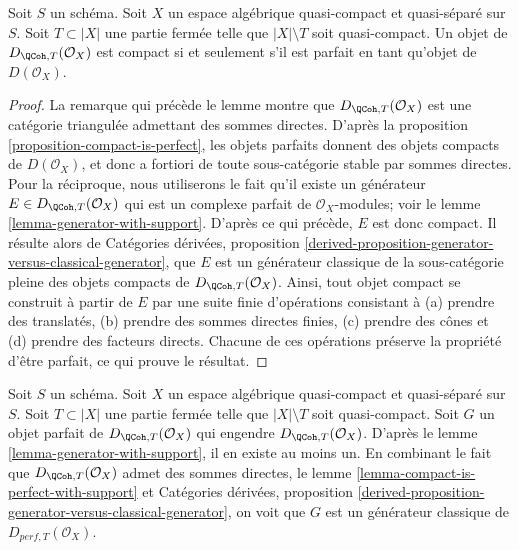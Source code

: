 \begin{lemma}
\label{lemma-compact-is-perfect-with-support}
Soit $S$ un sch\'ema.
Soit $X$ un espace alg\'ebrique quasi-compact et quasi-s\'epar\'e sur $S$.
Soit $T \subset |X|$ une partie ferm\'ee telle que $|X| \setminus T$
soit quasi-compact. Un objet de $D_{\QCoh, T}(\mathcal{O}_X)$ est compact
si et seulement s'il est parfait en tant qu'objet de $D(\mathcal{O}_X)$.
\end{lemma}

\begin{proof}
La remarque qui pr\'ec\`ede le lemme montre que
$D_{\QCoh, T}(\mathcal{O}_X)$ est une cat\'egorie triangul\'ee
admettant des sommes directes.
D'apr\`es la proposition \ref{proposition-compact-is-perfect},
les objets parfaits donnent des objets compacts de
$D(\mathcal{O}_X)$, et donc a fortiori de toute sous-cat\'egorie
stable par sommes directes. Pour la r\'eciproque, nous utiliserons le fait
qu'il existe un g\'en\'erateur
$E \in D_{\QCoh, T}(\mathcal{O}_X)$ qui est un complexe parfait
de $\mathcal{O}_X$-modules; voir le
lemme \ref{lemma-generator-with-support}.
D'apr\`es ce qui pr\'ec\`ede, $E$ est donc compact. Il r\'esulte alors de
Cat\'egories d\'eriv\'ees, proposition
\ref{derived-proposition-generator-versus-classical-generator},
que $E$ est un g\'en\'erateur classique de la sous-cat\'egorie pleine
des objets compacts de $D_{\QCoh, T}(\mathcal{O}_X)$.
Ainsi, tout objet compact se construit \`a partir de $E$ par
une suite finie d'op\'erations consistant \`a
(a) prendre des translat\'es, (b) prendre des sommes directes finies,
(c) prendre des c\^ones et
(d) prendre des facteurs directs. Chacune de ces op\'erations pr\'eserve
la propri\'et\'e d'\^etre parfait, ce qui prouve le r\'esultat.
\end{proof}

\begin{remark}
\label{remark-classical-generator-with-support}
Soit $S$ un sch\'ema.
Soit $X$ un espace alg\'ebrique quasi-compact et quasi-s\'epar\'e sur $S$.
Soit $T \subset |X|$ une partie ferm\'ee telle que $|X| \setminus T$
soit quasi-compact. Soit $G$ un
objet parfait de $D_{\QCoh, T}(\mathcal{O}_X)$ qui engendre
$D_{\QCoh, T}(\mathcal{O}_X)$. D'apr\`es le lemme
\ref{lemma-generator-with-support}, il en existe au moins un. En combinant
le fait que $D_{\QCoh, T}(\mathcal{O}_X)$ admet des sommes directes, le
lemme \ref{lemma-compact-is-perfect-with-support} et
Cat\'egories d\'eriv\'ees, proposition
\ref{derived-proposition-generator-versus-classical-generator},
on voit que $G$ est un g\'en\'erateur classique de
$D_{perf, T}(\mathcal{O}_X)$.
\end{remark}

